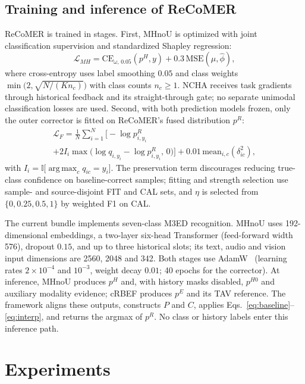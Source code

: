 \documentclass[10pt,twocolumn,letterpaper]{article}
\DeclareMathOperator*{\argmaxop}{arg\,max}
\newcommand{\ind}{\mathbb{I}}
\newcommand{\mean}{\mathrm{mean}}
\begin{document}
\subsection{Training and inference of ReCoMER}
\label{sec:training}

ReCoMER is trained in stages.
First, MHnoU is optimized with joint classification supervision and standardized Shapley regression:
\begin{equation}
  \mathcal{L}_{MH} = \mathrm{CE}_{\omega,\,0.05}(p^H, y) + 0.3\,\mathrm{MSE}(\mu, \hat{\phi}),
  \label{eq:lossmh}
\end{equation}
where cross-entropy uses label smoothing $0.05$ and class weights $\min\!\big(2, \sqrt{N/(K n_c)}\big)$ with class counts $n_c \geq 1$.
NCHA receives task gradients through historical feedback and its straight-through gate; no separate unimodal classification losses are used.
Second, with both prediction models frozen, only the outer corrector is fitted on ReCoMER's fused distribution $p^R$:
\begin{multline}
  \mathcal{L}_{F} = \frac{1}{N}\sum_{i=1}^{N}\Big[-\log p^{R}_{i,y_i} \\
    + 2 I_i \max\!\big(\log q_{i,y_i} - \log p^{R}_{i,y_i},\, 0\big)\Big]
    + 0.01\,\mean_{i,c}(\delta_{ic}^{2}),
  \label{eq:lossfusion}
\end{multline}
with $I_i = \ind\big[\argmaxop_c q_{ic} = y_i\big]$.
The preservation term discourages reducing true-class confidence on baseline-correct samples; fitting and strength selection use sample- and source-disjoint FIT and CAL sets, and $\eta$ is selected from $\{0, 0.25, 0.5, 1\}$ by weighted F1 on CAL.

The current bundle implements seven-class M3ED recognition.
MHnoU uses 192-dimensional embeddings, a two-layer six-head Transformer (feed-forward width 576), dropout $0.15$, and up to three historical slots; its text, audio and vision input dimensions are 2560, 2048 and 342.
Both stages use AdamW~\cite{loshchilov2019adamw} (learning rates $2{\times}10^{-4}$ and $10^{-3}$, weight decay $0.01$; 40 epochs for the corrector).
At inference, MHnoU produces $p^H$ and, with history masks disabled, $p^{H0}$ and auxiliary modality evidence; cRBEF produces $p^E$ and its TAV reference.
The framework aligns these outputs, constructs $P$ and $C$, applies Eqs.~\eqref{eq:baseline}--\eqref{eq:interp}, and returns the argmax of $p^R$.
No class or history labels enter this inference path.

\section{Experiments}
\label{sec:experiments}
\end{document}
